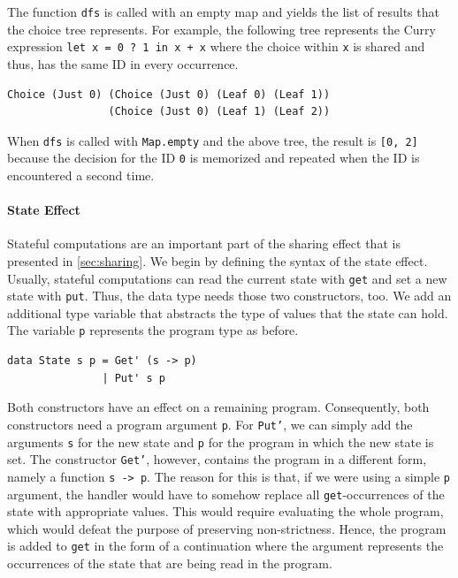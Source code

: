 \documentclass[a4paper, 11pt, fleqn, twoside, abstract=on]{scrreprt}
\newcommand{\hinl}[1]{\texttt{#1}}
\begin{document}
The function \hinl{dfs} is called with an empty map and yields the list of results that the choice tree represents.
For example, the following tree represents the Curry expression \hinl{let x = 0 ? 1 in x + x} where the choice within \hinl{x} is shared and thus, has the same ID in every occurrence.

\begin{verbatim}
Choice (Just 0) (Choice (Just 0) (Leaf 0) (Leaf 1)) 
                (Choice (Just 0) (Leaf 1) (Leaf 2))
\end{verbatim}
\noindent
When \hinl{dfs} is called with \hinl{Map.empty} and the above tree, the result is \hinl{[0, 2]} because the decision for the ID \hinl{0} is memorized and repeated when the ID is encountered a second time.

\paragraph{State Effect}
Stateful computations are an important part of the sharing effect that is presented in \autoref{sec:sharing}.
We begin by defining the syntax of the state effect.
Usually, stateful computations can read the current state with \hinl{get} and set a new state with \hinl{put}.
Thus, the data type needs those two constructors, too.
We add an additional type variable that abstracts the type of values that the state can hold.
The variable \hinl{p} represents the program type as before.

\begin{verbatim}
data State s p = Get' (s -> p)
               | Put' s p
\end{verbatim}

Both constructors have an effect on a remaining program.
Consequently, both constructors need a program argument \hinl{p}.
For \hinl{Put'}, we can simply add the arguments \hinl{s} for the new state and \hinl{p} for the program in which the new state is set.
The constructor \hinl{Get'}, however, contains the program in a different form, namely a function \hinl{s -> p}.
The reason for this is that, if we were using a simple \hinl{p} argument, the handler would have to somehow replace all \hinl{get}-occurrences of the state with appropriate values.
This would require evaluating the whole program, which would defeat the purpose of preserving non-strictness.
Hence, the program is added to \hinl{get} in the form of a continuation where the argument represents the occurrences of the state that are being read in the program.
\end{document}
